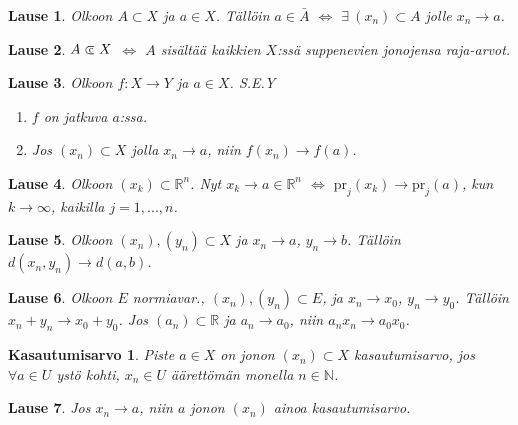 \documentclass[landscape,a4paper,10pt]{article}
\newcommand\cls{\mathrel{\ooalign{$\subset$\cr
\hidewidth\raise.225ex\hbox{$\text{{\scriptsize c}}\mkern2mu$}\cr}}}
\theoremstyle{customtheoremstyle}
\newtheorem*{theorem}{Lause}
\begin{document}
\begin{multicols*}{3}
\begin{theorem}
  Olkoon $A \subset X$ ja $a \in X$. Tällöin $a \in \bar{A}$ $\iff$ $\exists \:
  (x_n) \subset A$ jolle $x_n \rightarrow a$.
\end{theorem}

\begin{theorem}
  $A \cls X$ $\iff$ $A$ sisältää kaikkien $X$:ssä suppenevien jonojensa
  raja-arvot.
\end{theorem}

\begin{theorem}
  Olkoon $f: X \rightarrow Y$ ja $a \in X$. S.E.Y
  \begin{enumerate}
    \item{$f$ on jatkuva $a$:ssa.}
    \item{Jos $(x_n) \subset X$ jolla $x_n \rightarrow a$, niin $f(x_n)
      \rightarrow f(a)$.}
  \end{enumerate}
\end{theorem}

\begin{theorem}
  Olkoon $(x_k) \subset \mathbb{R}^n$. Nyt $x_k \rightarrow a \in \mathbb{R}^n$
  $\iff$ $\text{pr}_j(x_k) \rightarrow \text{pr}_j(a)$, kun $k \rightarrow
  \infty$, kaikilla $j = 1,...,n$.
\end{theorem}

\begin{theorem}
  Olkoon $(x_n), (y_n) \subset X$ ja $x_n \rightarrow a$, $y_n \rightarrow b$.
  Tällöin $d(x_n, y_n) \rightarrow d(a,b)$.
\end{theorem}

\begin{theorem}
  Olkoon $E$ normiavar., $(x_n), (y_n) \subset E$, ja $x_n \rightarrow x_0$,
  $y_n \rightarrow y_0$. Tällöin $x_n + y_n \rightarrow x_0 + y_0$. Jos $(a_n)
  \subset \mathbb{R}$ ja $a_n \rightarrow a_0$, niin $a_n x_n \rightarrow a_0
  x_0$.
\end{theorem}

\newtheorem*{defn:kasautumisarvo}{Kasautumisarvo}
\begin{defn:kasautumisarvo}
  Piste $a \in X$ on jonon $(x_n) \subset X$ kasautumisarvo, jos $\forall a \in
  U$ ystö kohti, $x_n \in U$ äärettömän monella $n \in \mathbb{N}$.
\end{defn:kasautumisarvo}

\begin{theorem}
  Jos $x_n \rightarrow a$, niin $a$ jonon $(x_n)$ ainoa kasautumisarvo.
\end{theorem}


\end{multicols*}
\end{document}
